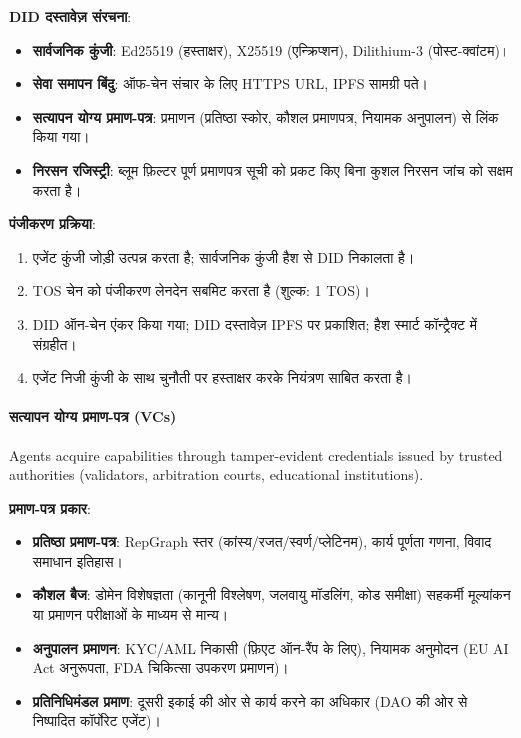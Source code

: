 \documentclass[11pt]{article}
\begin{document}
\begin{itemize}[noitemsep]
\begin{itemize}[noitemsep]
\textbf{DID दस्तावेज़ संरचना}:
\begin{itemize}[noitemsep]
  \item \textbf{सार्वजनिक कुंजी}: Ed25519 (हस्ताक्षर), X25519 (एन्क्रिप्शन), Dilithium-3 (पोस्ट-क्वांटम)।
  \item \textbf{सेवा समापन बिंदु}: ऑफ-चेन संचार के लिए HTTPS URL, IPFS सामग्री पते।
  \item \textbf{सत्यापन योग्य प्रमाण-पत्र}: प्रमाणन (प्रतिष्ठा स्कोर, कौशल प्रमाणपत्र, नियामक अनुपालन) से लिंक किया गया।
  \item \textbf{निरसन रजिस्ट्री}: ब्लूम फ़िल्टर पूर्ण प्रमाणपत्र सूची को प्रकट किए बिना कुशल निरसन जांच को सक्षम करता है।
\end{itemize}

\textbf{पंजीकरण प्रक्रिया}:
\begin{enumerate}[noitemsep]
  \item एजेंट कुंजी जोड़ी उत्पन्न करता है; सार्वजनिक कुंजी हैश से DID निकालता है।
  \item TOS चेन को पंजीकरण लेनदेन सबमिट करता है (शुल्क: 1 TOS)।
  \item DID ऑन-चेन एंकर किया गया; DID दस्तावेज़ IPFS पर प्रकाशित; हैश स्मार्ट कॉन्ट्रैक्ट में संग्रहीत।
  \item एजेंट निजी कुंजी के साथ चुनौती पर हस्ताक्षर करके नियंत्रण साबित करता है।
\end{enumerate}

\paragraph{सत्यापन योग्य प्रमाण-पत्र (VCs)}
Agents acquire capabilities through tamper-evident credentials issued by trusted authorities (validators, arbitration courts, educational institutions).

\textbf{प्रमाण-पत्र प्रकार}:
\begin{itemize}[noitemsep]
  \item \textbf{प्रतिष्ठा प्रमाण-पत्र}: RepGraph स्तर (कांस्य/रजत/स्वर्ण/प्लेटिनम), कार्य पूर्णता गणना, विवाद समाधान इतिहास।
  \item \textbf{कौशल बैज}: डोमेन विशेषज्ञता (कानूनी विश्लेषण, जलवायु मॉडलिंग, कोड समीक्षा) सहकर्मी मूल्यांकन या प्रमाणन परीक्षाओं के माध्यम से मान्य।
  \item \textbf{अनुपालन प्रमाणन}: KYC/AML निकासी (फ़िएट ऑन-रैंप के लिए), नियामक अनुमोदन (EU AI Act अनुरूपता, FDA चिकित्सा उपकरण प्रमाणन)।
  \item \textbf{प्रतिनिधिमंडल प्रमाण}: दूसरी इकाई की ओर से कार्य करने का अधिकार (DAO की ओर से निष्पादित कॉर्पोरेट एजेंट)।
\end{itemize}


\end{itemize}
\end{itemize}
\end{document}
